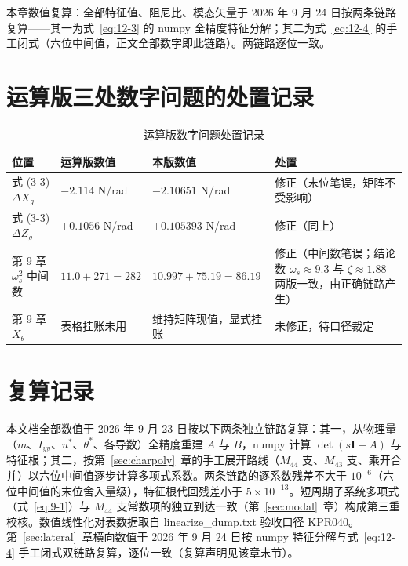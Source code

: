 \documentclass[11pt,a4paper]{ctexart}
\begin{document}
本章数值复算：全部特征值、阻尼比、模态矢量于 2026 年 9 月 24 日按两条链路复算——其一为式~\eqref{eq:12-3} 的 numpy 全精度特征分解；其二为式~\eqref{eq:12-4} 的手工闭式（六位中间值，正文全部数字即此链路）。两链路逐位一致。

\appendix

\section{运算版三处数字问题的处置记录}\label{app:A}

\begin{table}[htbp]
\centering\small
\begin{tabularx}{\textwidth}{lllX}
\toprule
位置 & 运算版数值 & 本版数值 & 处置 \\
\midrule
式 (3-3) $\Delta X_g$ & $-2.114$ N/rad & $-2.10651$ N/rad & 修正（末位笔误，矩阵不受影响） \\
式 (3-3) $\Delta Z_g$ & $+0.1056$ N/rad & $+0.105393$ N/rad & 修正（同上） \\
第 9 章 $\omega_s^2$ 中间数 & $11.0+271=282$ & $10.997+75.19=86.19$ & 修正（中间数笔误；结论数 $\omega_s\approx 9.3$ 与 $\zeta\approx 1.88$ 两版一致，由正确链路产生） \\
第 9 章 $X_\theta$ & 表格挂账未用 & 维持矩阵现值，显式挂账 & 未修正，待口径裁定 \\
\bottomrule
\end{tabularx}
\caption{运算版数字问题处置记录}
\end{table}

\section{复算记录}\label{app:B}

本文档全部数值于 2026 年 9 月 23 日按以下两条独立链路复算：其一，从物理量（$m$、$I_{yy}$、$u^{*}$、$\theta^{*}$、各导数）全精度重建 $A$ 与 $B$，numpy 计算 $\det(s\mathbf{I}-A)$ 与特征根；其二，按第~\ref{sec:charpoly}~章的手工展开路线（$M_{44}$ 支、$M_{43}$ 支、乘开合并）以六位中间值逐步计算多项式系数。两条链路的逐系数残差不大于 $10^{-6}$（六位中间值的末位舍入量级），特征根代回残差小于 $5\times10^{-13}$。短周期子系统多项式（式~\eqref{eq:9-1}）与 $M_{44}$ 支常数项的独立到达一致（第~\ref{sec:modal}~章）构成第三重校核。数值线性化对表数据取自 linearize\_dump.txt 验收口径 KPR040。第~\ref{sec:lateral}~章横向数值于 2026 年 9 月 24 日按 numpy 特征分解与式~\eqref{eq:12-4} 手工闭式双链路复算，逐位一致（复算声明见该章末节）。
\end{document}
